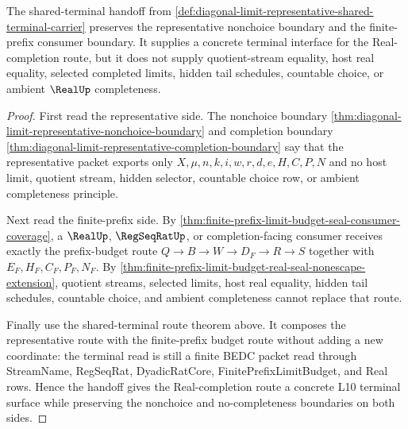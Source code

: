 \begin{theorem}
\label{thm:diagonal-limit-representative-finite-prefix-budget-handoff}
The shared-terminal handoff from \autoref{def:diagonal-limit-representative-shared-terminal-carrier} preserves the representative nonchoice boundary and the finite-prefix consumer boundary. It supplies a concrete terminal interface for the Real-completion route, but it does not supply quotient-stream equality, host real equality, selected completed limits, hidden tail schedules, countable choice, or ambient $\RealUp$ completeness.
\end{theorem}
\begin{proof}
First read the representative side. The nonchoice boundary \autoref{thm:diagonal-limit-representative-nonchoice-boundary} and completion boundary \autoref{thm:diagonal-limit-representative-completion-boundary} say that the representative packet exports only $X,\mu,n,k,i,w,r,d,e,H,C,P,N$ and no host limit, quotient stream, hidden selector, countable choice row, or ambient completeness principle.

Next read the finite-prefix side. By \autoref{thm:finite-prefix-limit-budget-seal-consumer-coverage}, a $\RealUp$, $\RegSeqRatUp$, or completion-facing consumer receives exactly the prefix-budget route $Q \to B \to W \to D_F \to R \to S$ together with $E_F,H_F,C_F,P_F,N_F$. By \autoref{thm:finite-prefix-limit-budget-real-seal-nonescape-extension}, quotient streams, selected limits, host real equality, hidden tail schedules, countable choice, and ambient completeness cannot replace that route.

Finally use the shared-terminal route theorem above. It composes the representative route with the finite-prefix budget route without adding a new coordinate: the terminal read is still a finite BEDC packet read through StreamName, RegSeqRat, DyadicRatCore, FinitePrefixLimitBudget, and Real rows. Hence the handoff gives the Real-completion route a concrete L10 terminal surface while preserving the nonchoice and no-completeness boundaries on both sides.
\end{proof}

